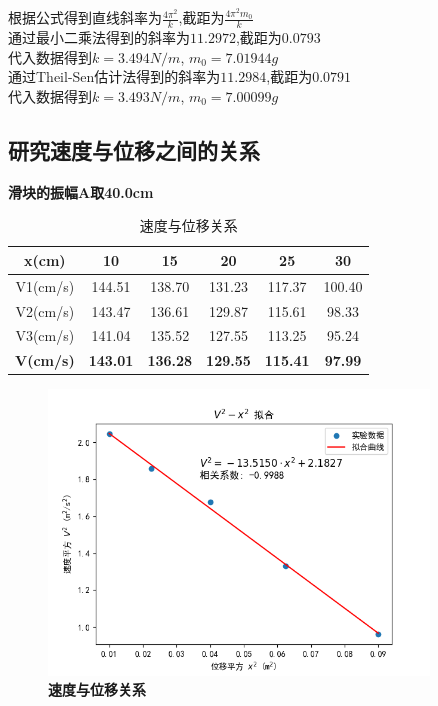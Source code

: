 \documentclass[UTF8]{article}
\theoremstyle{MyLineTheoremStyle} %
\theoremstyle{MyBlockTheoremStyle} %
\theoremstyle{MySubsubsectionStyle} %
\begin{document}
\indent 根据公式得到直线斜率为$\frac{4\pi^2}{k}$,截距为$\frac{4\pi^2m_0}{k}$\\

\indent 通过最小二乘法得到的斜率为$11.2972$,截距为$0.0793$\\

\indent 代入数据得到$k=3.494N/m$, $m_0=7.01944g$\\

\indent 通过Theil-Sen估计法得到的斜率为$11.2984$,截距为$0.0791$\\

\indent 代入数据得到$k=3.493N/m$, $m_0=7.00099g$\\


\cleardoublepage
\subsection{研究速度与位移之间的关系}
\textbf{滑块的振幅A取40.0cm}

\begin{table}[H]
    \centering
    \begin{tabular}{|c|c|c|c|c|c|}
        \hline
        x(cm) & 10 & 15 & 20 & 25 & 30\\
        \hline
        V1(cm/s) & 144.51 & 138.70 & 131.23 & 117.37 & 100.40\\
        \hline
        V2(cm/s) & 143.47 & 136.61 & 129.87 & 115.61 & 98.33\\
        \hline
        V3(cm/s) & 141.04 & 135.52 & 127.55 & 113.25 & 95.24\\
        \hline
        \textbf{V(cm/s)} & \textbf{143.01} & \textbf{136.28} & \textbf{129.55} & \textbf{115.41} & \textbf{97.99}\\
        \hline			
    \end{tabular}
    \caption{\small 速度与位移关系}
\end{table}

\begin{figure}[H]
    \centering
    \includegraphics[width=0.9\textwidth]{Figure_3.png}
    \caption{\bfseries 速度与位移关系}
    \label{速度与位移关系}
\end{figure}
\end{document}
